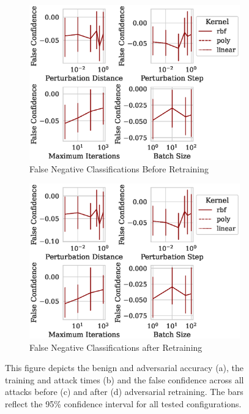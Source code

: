 \documentclass[fonts]{icst}
\begin{document}
\begin{figure}
\begin{subfigure}[b]{0.45\textwidth}
         \label{fig:retrain_time}
     \end{subfigure}
     \hfill
     \begin{subfigure}[b]{0.45\textwidth}
         \centering
         \includegraphics[width=\textwidth]{./generated/confidence_vs_attack_parameters.eps}
         \caption{False Negative Classifications Before Retraining}
        \label{fig:before_retrain}
     \end{subfigure}
     \hfill
     \begin{subfigure}[b]{0.45\textwidth}
         \centering
         \includegraphics[width=\textwidth]{./generated/retrain_confidence_vs_attack_parameters.eps}
         \caption{False Negative Classifications after Retraining}
        \label{fig:after_retrain}
     \end{subfigure}
     \hfill
     \label{fig:retratin}
     \caption{This figure depicts the benign and adversarial accuracy (a), the training and attack times (b) and the false confidence across all attacks before (c) and after (d) adversarial retraining.
The bars reflect the 95\% confidence interval for all tested configurations.}
\end{figure}
\end{document}
